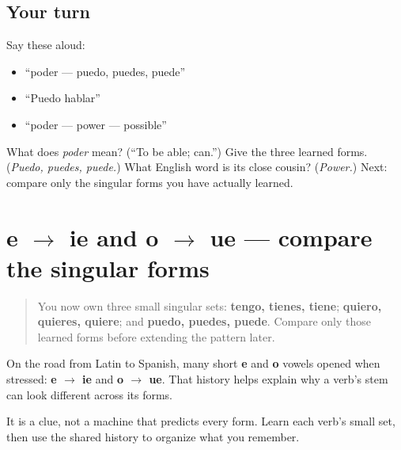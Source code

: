 \subsection*{Your turn}
Say these aloud:

\begin{itemize}
\raggedright
  \item “poder — puedo, puedes, puede”
  \item “Puedo hablar”
  \item “poder — power — possible”
\end{itemize}

\begin{tcolorbox}[breakable,colback=teal!4,colframe=teal!35!black,title={Before you move on}]
What does \emph{poder} mean? (“To be able; can.”) Give the three learned forms. (\emph{Puedo, puedes, puede.}) What English word is its close cousin? (\emph{Power.}) Next: compare only the singular forms you have actually learned.
\end{tcolorbox}
\section[e to ie and o to ue]{e $\to$ ie and o $\to$ ue — compare the singular forms}

\label{lesson:ES-C11-stem-changes}



\begin{quote}
You now own three small singular sets: \textbf{tengo, tienes, tiene}; \textbf{quiero, quieres, quiere}; and \textbf{puedo, puedes, puede}. Compare only those learned forms before extending the pattern later.
\end{quote}

\begin{cousinweb}
On the road from Latin to Spanish, many short \textbf{e} and \textbf{o} vowels opened when stressed: \textbf{e $\to$ ie} and \textbf{o $\to$ ue}. That history helps explain why a verb's stem can look different across its forms.

It is a clue, not a machine that predicts every form. Learn each verb's small set, then use the shared history to organize what you remember.
\end{cousinweb}

